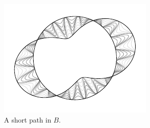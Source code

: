 \documentclass[a4,danish]{article}
\theoremstyle{break}
\theoremstyle{definition}
\theoremstyle{Break}
\newcommand{\R}{\mathbb{R}}
\renewcommand{\S}{\mathbb{S}}
\renewcommand{\phi}{\varphi}
\begin{document}
\begin{figure}
  \centerline{\includegraphics[width=1\linewidth]{zero_L2metric.pdf}}
  \caption{A short path in $B$.}
  \label{fig:zero_L2metric}
\end{figure}


\end{document}
